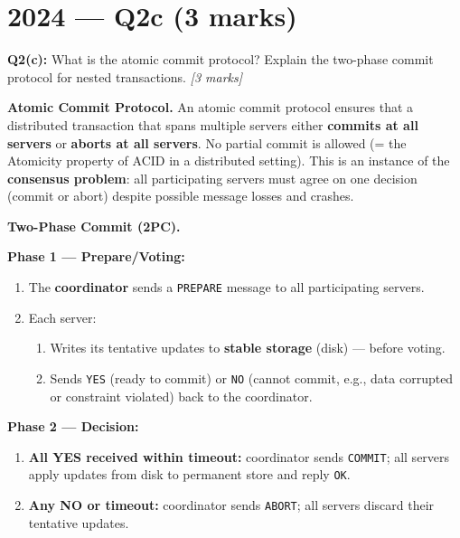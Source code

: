 \documentclass[12pt,a4paper]{article}
\begin{document}
\newpage
\section{2024 — Q2c (3 marks)}

\begin{qbox}
\textbf{Q2(c):} What is the atomic commit protocol? Explain the two-phase commit protocol
for nested transactions. \hfill \textit{[3 marks]}
\end{qbox}

\begin{solbox}
\textbf{Atomic Commit Protocol.}
An atomic commit protocol ensures that a distributed transaction that spans multiple
servers either \textbf{commits at all servers} or \textbf{aborts at all servers}.
No partial commit is allowed (= the Atomicity property of ACID in a distributed setting).
This is an instance of the \textbf{consensus problem}: all participating servers must
agree on one decision (commit or abort) despite possible message losses and crashes.

\medskip
\textbf{Two-Phase Commit (2PC).}

\textbf{Phase 1 — Prepare/Voting:}
\begin{enumerate}
  \item The \textbf{coordinator} sends a \texttt{PREPARE} message to all participating servers.
  \item Each server:
        \begin{enumerate}
          \item Writes its tentative updates to \textbf{stable storage} (disk) — before voting.
          \item Sends \texttt{YES} (ready to commit) or \texttt{NO} (cannot commit, e.g.,
                data corrupted or constraint violated) back to the coordinator.
        \end{enumerate}
\end{enumerate}

\textbf{Phase 2 — Decision:}
\begin{enumerate}
  \item \textbf{All YES received within timeout:}
        coordinator sends \texttt{COMMIT}; all servers apply updates from disk to permanent
        store and reply \texttt{OK}.
  \item \textbf{Any NO or timeout:}
        coordinator sends \texttt{ABORT}; all servers discard their tentative updates.
\end{enumerate}


\end{solbox}
\end{document}
